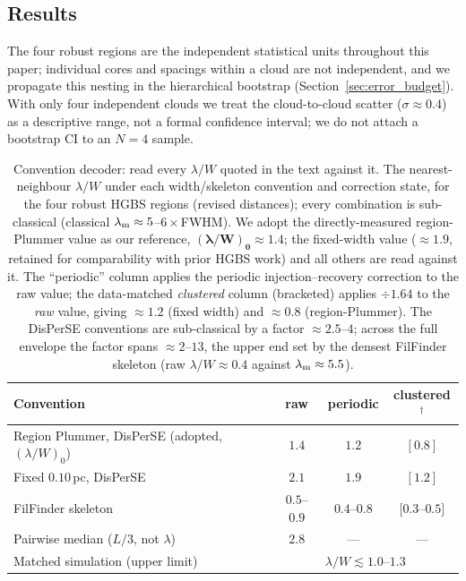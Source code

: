 \documentclass[usenatbib,twoside,twocolumn]{mnras}
\begin{document}
\subsection{Results}

The four robust regions are the independent statistical units throughout this paper; individual cores and spacings within a cloud are not independent, and we propagate this nesting in the hierarchical bootstrap (Section~\ref{sec:error_budget}). With only four independent clouds we treat the cloud-to-cloud scatter ($\sigma\approx0.4$) as a descriptive range, not a formal confidence interval; we do not attach a bootstrap CI to an $N=4$ sample.

\begin{table}
\caption{Convention decoder: read every $\lambda/W$ quoted in the text against it. The nearest-neighbour $\lambda/W$ under each width/skeleton convention and correction state, for the four robust HGBS regions (revised distances); every combination is sub-classical (classical $\lambda_{\rm m}\approx5$--$6\times$FWHM). We adopt the directly-measured region-Plummer value as our reference, $\boldsymbol{(\lambda/W)_0\approx1.4}$; the fixed-width value ($\approx1.9$, retained for comparability with prior HGBS work) and all others are read against it. The ``periodic'' column applies the periodic injection--recovery correction to the raw value; the data-matched \emph{clustered} column (bracketed) applies $\div1.64$ to the \emph{raw} value, giving $\approx1.2$ (fixed width) and $\approx0.8$ (region-Plummer). The DisPerSE conventions are sub-classical by a factor $\approx2.5$--$4$; across the full envelope the factor spans $\approx2$--$13$, the upper end set by the densest FilFinder skeleton (raw $\lambda/W\approx0.4$ against $\lambda_{\rm m}\approx5.5$).}
\label{tab:headline}
\footnotesize
\setlength{\tabcolsep}{4pt}
\begin{tabular}{p{3.6cm}ccc}
\toprule
Convention & raw & periodic & clustered$^{\dagger}$ \\
\midrule
Region Plummer, DisPerSE (adopted, $(\lambda/W)_0$) & $\mathbf{1.4}$ & $1.2$ & $[0.8]$ \\
Fixed $0.10$\,pc, DisPerSE & $2.1$ & $1.9$ & $[1.2]$ \\
FilFinder skeleton & $0.5$--$0.9$ & $0.4$--$0.8$ & $[0.3$--$0.5]$ \\
Pairwise median ($L/3$, not $\lambda$) & $2.8$ & --- & --- \\
\midrule
Matched simulation (upper limit) & \multicolumn{3}{c}{$\lambda/W\lesssim1.0$--$1.3$} \\

\end{tabular}
\end{table}
\end{document}
